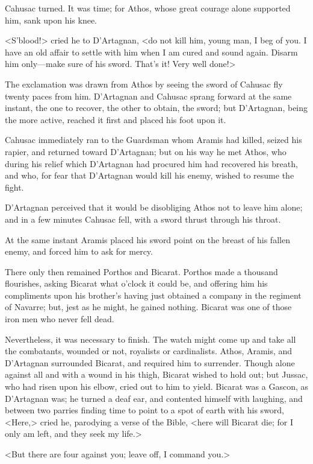 Cahusac turned. It was time; for Athos, whose great courage alone supported him, sank upon his knee. 

<S'blood!> cried he to D'Artagnan, <do not kill him, young man, I beg of you. I have an old affair to settle with him when I am cured and sound again. Disarm him only—make sure of his sword. That's it! Very well done!> 

The exclamation was drawn from Athos by seeing the sword of Cahusac fly twenty paces from him. D'Artagnan and Cahusac sprang forward at the same instant, the one to recover, the other to obtain, the sword; but D'Artagnan, being the more active, reached it first and placed his foot upon it. 

Cahusac immediately ran to the Guardsman whom Aramis had killed, seized his rapier, and returned toward D'Artagnan; but on his way he met Athos, who during his relief which D'Artagnan had procured him had recovered his breath, and who, for fear that D'Artagnan would kill his enemy, wished to resume the fight. 

D'Artagnan perceived that it would be disobliging Athos not to leave him alone; and in a few minutes Cahusac fell, with a sword thrust through his throat. 

At the same instant Aramis placed his sword point on the breast of his fallen enemy, and forced him to ask for mercy. 

There only then remained Porthos and Bicarat. Porthos made a thousand flourishes, asking Bicarat what o'clock it could be, and offering him his compliments upon his brother's having just obtained a company in the regiment of Navarre; but, jest as he might, he gained nothing. Bicarat was one of those iron men who never fell dead. 

Nevertheless, it was necessary to finish. The watch might come up and take all the combatants, wounded or not, royalists or cardinalists. Athos, Aramis, and D'Artagnan surrounded Bicarat, and required him to surrender. Though alone against all and with a wound in his thigh, Bicarat wished to hold out; but Jussac, who had risen upon his elbow, cried out to him to yield. Bicarat was a Gascon, as D'Artagnan was; he turned a deaf ear, and contented himself with laughing, and between two parries finding time to point to a spot of earth with his sword, <Here,> cried he, parodying a verse of the Bible, <here will Bicarat die; for I only am left, and they seek my life.> 

<But there are four against you; leave off, I command you.> 

